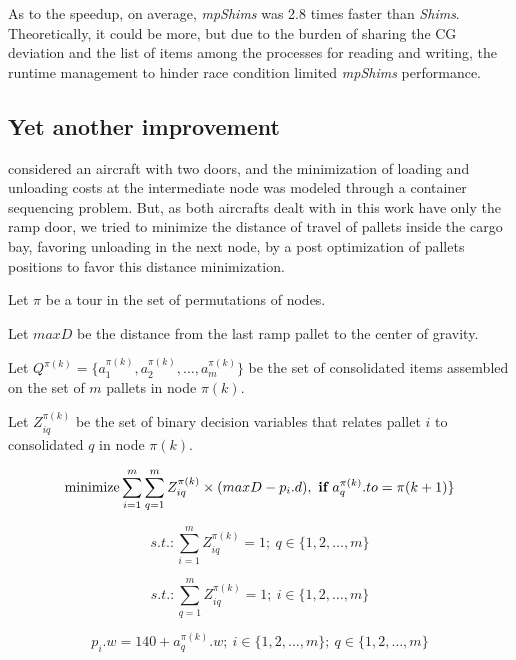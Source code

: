 \documentclass[preprint,authoryear]{elsarticle}
\begin{document}
As to the speedup, on average, {\it mpShims} was 2.8 times faster than {\it Shims}. Theoretically, it could be more, but due to the burden of sharing the CG deviation and the list of items among the processes for reading and writing, the runtime management to hinder race condition limited {\it mpShims} performance.

\subsection{Yet another improvement}
\label{improvement}

\cite{LurkinSchyns2015} considered an aircraft with two doors, and the minimization of loading and unloading costs at the intermediate node was modeled through a container sequencing problem. But, as both aircrafts dealt with in this work have only the ramp door, we tried to minimize the distance of travel of pallets inside the cargo bay, favoring unloading in the next node, by a post optimization of pallets positions to favor this distance minimization.

Let $\pi$ be a tour in the set of permutations of nodes.

Let $maxD$ be the distance from the last ramp pallet to the center of gravity.

Let $Q^{\pi(k)}  = \{ a^{\pi(k)}_1, a^{\pi(k)}_2, \ldots, a^{\pi(k)}_m \}$ be the set of consolidated items assembled on the set of $m$ pallets in node $\pi(k)$.

Let $Z^{\pi(k)}_{iq}$ be the set of binary decision variables that relates pallet $i$ to consolidated $q$ in node $\pi(k)$.

\begin{equation} \label{eq:distobj}
	\mbox{minimize} \sum_{i=1}^{m} \sum_{q=1}^{m} Z^{\pi(k)}_{iq} \times ( maxD - p_i.d) ,\ \mbox{{\bf if}}\ a^{\pi(k)}_q.to = \pi(k+1) \}
\end{equation}

\begin{equation} \label{eq:distcons}
	s.t.: \sum_{i=1}^{m} Z^{\pi(k)}_{iq} = 1;\ q \in \{1,2,\ldots,m\}
\end{equation}

\begin{equation} \label{eq:distpallets}
	s.t.: \sum_{q=1}^{m} Z^{\pi(k)}_{iq}=1;\ i \in \{1,2,\ldots,m\}
\end{equation}

\begin{equation} \label{eq:distpalletw}
	p_i.w = 140 + a^{\pi(k)}_q.w ;\ i \in \{1,2,\ldots,m\};\ q \in \{1,2,\ldots,m\}
\end{equation}
\end{document}
